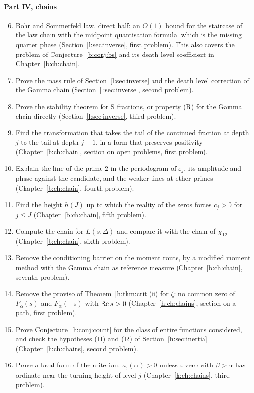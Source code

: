 \paragraph{Part IV, chains}
\begin{enumerate}
\setcounter{enumi}{5}
\item Bohr and Sommerfeld law, direct half: an $O(1)$ bound for the staircase of the law chain with the midpoint quantisation formula, which is the missing quarter phase (Section~\ref{l:sec:inverse}, first problem). This also covers the problem of Conjecture~\ref{b:conj:bs} and its death level coefficient in Chapter~\ref{b:ch:chain}.
\item Prove the mass rule of Section~\ref{l:sec:inverse} and the death level correction of the Gamma chain (Section~\ref{l:sec:inverse}, second problem).
\item Prove the stability theorem for S fractions, or property (R) for the Gamma chain directly (Section~\ref{l:sec:inverse}, third problem).
\item Find the transformation that takes the tail of the continued fraction at depth $j$ to the tail at depth $j+1$, in a form that preserves positivity (Chapter~\ref{b:ch:chain}, section on open problems, first problem).
\item Explain the line of the prime $2$ in the periodogram of $\varepsilon_j$, its amplitude and phase against the candidate, and the weaker lines at other primes (Chapter~\ref{b:ch:chain}, fourth problem).
\item Find the height $h(J)$ up to which the reality of the zeros forces $c_j>0$ for $j\le J$ (Chapter~\ref{b:ch:chain}, fifth problem).
\item Compute the chain for $L(s,\Delta)$ and compare it with the chain of $\chi_{12}$ (Chapter~\ref{b:ch:chain}, sixth problem).
\item Remove the conditioning barrier on the moment route, by a modified moment method with the Gamma chain as reference measure (Chapter~\ref{b:ch:chain}, seventh problem).
\item Remove the proviso of Theorem~\ref{h:thm:crit}(ii) for $\zeta$: no common zero of $F_\alpha(s)$ and $F_\alpha(-s)$ with $\operatorname{Re} s>0$ (Chapter~\ref{h:ch:chains}, section on a path, first problem).
\item Prove Conjecture~\ref{h:conj:count} for the class of entire functions considered, and check the hypotheses (I1) and (I2) of Section~\ref{h:sec:inertia} (Chapter~\ref{h:ch:chains}, second problem).
\item Prove a local form of the criterion: $a_j(\alpha)>0$ unless a zero with $\beta>\alpha$ has ordinate near the turning height of level $j$ (Chapter~\ref{h:ch:chains}, third problem).

\end{enumerate}
